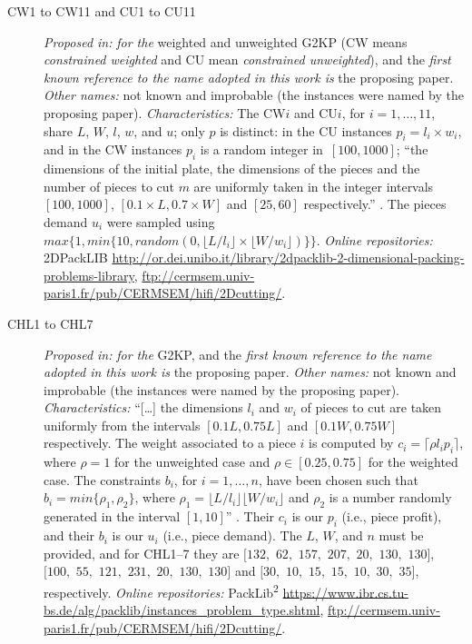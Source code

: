 \documentclass[ppgc,tese,english,formais,babel]{iiufrgs}
\begin{document}
\begin{description}
\item [CW1 to CW11 and CU1 to CU11] \emph{Proposed in:} \citet{fayard:1998} \emph{for the} weighted and unweighted G2KP (CW means \emph{constrained weighted} and CU mean \emph{constrained unweighted}), and the \emph{first known reference to the name adopted in this work is} the proposing paper. \emph{Other names:} not known and improbable (the instances were named by the proposing paper). \emph{Characteristics: } The CW\(i\) and CU\(i\), for \(i = 1, \dots, 11\), share \(L\), \(W\), \(l\), \(w\), and \(u\); only \(p\) is distinct: in the CU instances \(p_i = l_i \times w_i\), and in the CW instances \(p_i\) is a random integer in~\([100, 1000]\); ``the dimensions of the initial plate, the dimensions of the pieces and the number of pieces to cut \(m\) are uniformly taken in the integer intervals \([100, 1000]\), \([0.1 \times L, 0.7 \times W]\) and \([25, 60]\) respectively.'' \citep{fayard:1998}. The pieces demand \(u_i\) were sampled using~\(max\{1, min\{10, random(0, \lfloor L/l_i \rfloor \times \lfloor W/w_i \rfloor)\}\}\). \emph{Online repositories:} 2DPackLIB \url{http://or.dei.unibo.it/library/2dpacklib-2-dimensional-packing-problems-library}, \url{ftp://cermsem.univ-paris1.fr/pub/CERMSEM/hifi/2Dcutting/}.
\item [CHL1 to CHL7] \emph{Proposed in:} \citet{cung:2000} \emph{for the} G2KP, and the \emph{first known reference to the name adopted in this work is} the proposing paper. \emph{Other names: } not known and improbable (the instances were named by the proposing paper). \emph{Characteristics: } ``[\dots] the dimensions \(l_i\) and \(w_i\) of pieces to cut are taken uniformly from the intervals \([0.1L, 0.75L]\) and \([0.1W, 0.75W]\) respectively. The weight associated to a piece \(i\) is computed by \(c_i = \lceil\rho l_i p_i\rceil\), where \(\rho = 1\) for the unweighted case and \(\rho \in [0.25, 0.75]\) for the weighted case. The constraints \(b_i\), for \(i = 1, \dots, n\), have been chosen such that \(b_i = min\{\rho_1, \rho_2\}\), where \(\rho_1 = \lfloor L/l_i \rfloor\lfloor W/w_i \rfloor \) and \(\rho_2\) is a number randomly generated in the interval \([1, 10]\)'' \citep{cung:2000}. Their \(c_i\) is our \(p_i\) (i.e., piece profit), and their \(b_i\) is our \(u_i\) (i.e., piece demand). The \(L\), \(W\), and \(n\) must be provided, and for CHL1--7 they are \([132,\) \(62,\) \(157,\) \(207,\) \(20,\) \(130,\) \(130]\), \([100,\) \(55,\) \(121,\) \(231,\) \(20,\) \(130,\) \(130]\) and \([30,\) \(10,\) \(15,\) \(15,\) \(10,\) \(30,\) \(35]\), respectively. \emph{Online repositories:} PackLib\textsuperscript{2} \url{https://www.ibr.cs.tu-bs.de/alg/packlib/instances_problem_type.shtml}, \url{ftp://cermsem.univ-paris1.fr/pub/CERMSEM/hifi/2Dcutting/}.

\end{description}
\end{document}
